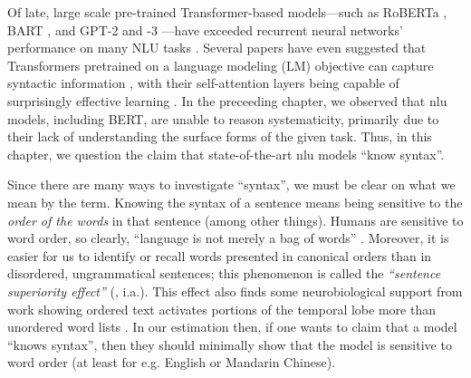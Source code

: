 \documentclass[letterpaper, 12pt]{report}
\begin{document}
Of late, large scale pre-trained Transformer-based \citep{vaswani-etal-2017-attention} models---such as RoBERTa \citep{liu-et-al-2019-roberta}, BART \citep{lewis-etal-2020-bart}, and GPT-2 and -3 \citep{radford-etal-2019-language,brown-etal-2020-gpt3}---have exceeded recurrent neural networks' performance on many NLU tasks \citep{wang-etal-2018-glue, wang-etal-2019-superglue}. %
Several papers have even suggested that Transformers pretrained on a language modeling (LM) objective can capture syntactic information \citep{hewitt-manning-2019-structural,jawahar-etal-2019-bert, warstadt-bowman-2020-can, wu-etal-2020-perturbed}, with their self-attention layers being capable of surprisingly effective learning \cite{rogers2020}.
In the preceeding chapter, we observed that \acrshort{nlu} models, including BERT, are unable to reason systematicity, primarily due to their lack of understanding the surface forms of the given task. Thus, in this chapter, we question the claim that state-of-the-art \acrshort{nlu} models ``know syntax''.

Since there are many ways to investigate ``syntax'', we must be clear on what we mean by the term.
Knowing the syntax of a sentence means being sensitive to the \textit{order of the words} in that sentence (among other things).  Humans are sensitive to word order, so clearly, ``language is not merely a bag of words'' \citep[p.156]{harris-1954-distributional}.
Moreover, it is easier for us to identify or recall words presented in canonical orders than in disordered, ungrammatical sentences; this phenomenon is called the \textit{``sentence superiority effect''} (\citealt{cattell-1886-time, scheerer1981early, toyota-2001-changes, baddeley-etal-2009-working, snell-grainger-2017-sentence, snell2019word, wen-etal-2019-parallel}, i.a.).
This effect also finds some neurobiological support from work showing ordered text activates portions of the temporal lobe more than unordered word lists \citep{bemis-pylkkanen-2013-basic, pylkkanen-etal-2014-building}.
In our estimation then, if one wants to claim that  a model ``knows syntax'', then they should minimally show that the model is sensitive to word order (at least for e.g. English or Mandarin Chinese).
\end{document}
